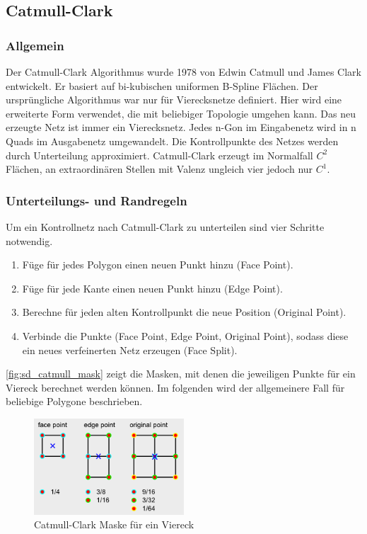 \subsection{Catmull-Clark} \label{subsec:catmull}

\subsubsection*{Allgemein}

Der Catmull-Clark Algorithmus wurde 1978 von Edwin Catmull und James Clark entwickelt.
Er basiert auf bi-kubischen uniformen B-Spline Flächen.
Der ursprüngliche Algorithmus war nur für Vierecksnetze definiert.
Hier wird eine erweiterte Form verwendet, die mit beliebiger Topologie umgehen kann.
Das neu erzeugte Netz ist immer ein Vierecksnetz.
Jedes n-Gon im Eingabenetz wird in n Quads
im Ausgabenetz umgewandelt.
Die Kontrollpunkte des Netzes werden durch Unterteilung approximiert.
Catmull-Clark erzeugt im Normalfall \(C^2\) Flächen,
an extraordinären Stellen mit Valenz ungleich vier jedoch
nur \(C^1\).
\cite[S. 75ff]{Zorin.subdivcourse} \cite[S. 52ff]{Standford.24.07.2015}


\subsubsection*{Unterteilungs- und Randregeln}

Um ein Kontrollnetz nach Catmull-Clark zu unterteilen sind vier Schritte notwendig.
\begin{enumerate}
	\item Füge für jedes Polygon einen neuen Punkt hinzu (Face Point).
	\item Füge für jede Kante einen neuen Punkt hinzu (Edge Point).
	\item Berechne für jeden alten Kontrollpunkt die neue Position (Original Point).
	\item Verbinde die Punkte (Face Point, Edge Point, Original Point), sodass diese ein
	neues verfeinerten Netz erzeugen (Face Split).
\end{enumerate}

\autoref{fig:sd_catmull_mask} zeigt die Masken, mit denen die jeweiligen Punkte für ein Viereck berechnet werden können.
Im folgenden wird der allgemeinere Fall für beliebige Polygone beschrieben.
\begin{figure}
\centering
\includegraphics[width=0.5\textwidth]{content/media/sd_catmull_mask.png}
\caption{Catmull-Clark Maske für ein Viereck \cite{yoshihitoyagi.23.12.2015}}
\label{fig:sd_catmull_mask}
\end{figure}

